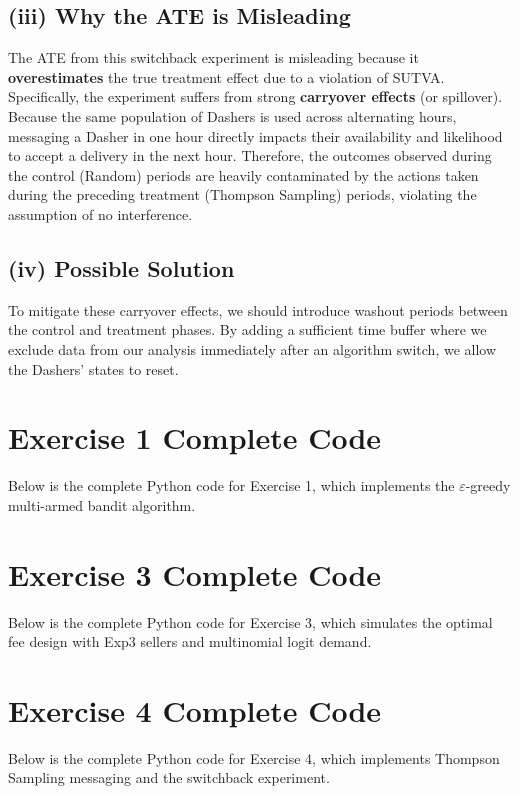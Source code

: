 \documentclass[12pt]{article}
\begin{document}
\subsection*{(iii) Why the ATE is Misleading}

The ATE from this switchback experiment is misleading because it \textbf{overestimates} the true treatment effect due to a violation of SUTVA. Specifically, the experiment suffers from strong \textbf{carryover effects} (or spillover). Because the same population of Dashers is used across alternating hours, messaging a Dasher in one hour directly impacts their availability and likelihood to accept a delivery in the next hour. Therefore, the outcomes observed during the control (Random) periods are heavily contaminated by the actions taken during the preceding treatment (Thompson Sampling) periods, violating the assumption of no interference.

\subsection*{(iv) Possible Solution}

To mitigate these carryover effects, we should introduce washout periods between the control and treatment phases. By adding a sufficient time buffer where we exclude data from our analysis immediately after an algorithm switch, we allow the Dashers' states to reset.
\newpage
\appendix
\section{Exercise 1 Complete Code}
\label{sec:ex1-code}

Below is the complete Python code for Exercise 1, which implements the $\varepsilon$-greedy multi-armed bandit algorithm.



\section{Exercise 3 Complete Code}
\label{sec:ex3-code}
Below is the complete Python code for Exercise 3, which simulates the optimal fee design with Exp3 sellers and multinomial logit demand.



\section{Exercise 4 Complete Code}
\label{sec:ex4-code}

Below is the complete Python code for Exercise 4, which implements Thompson Sampling messaging and the switchback experiment.


\end{document}
